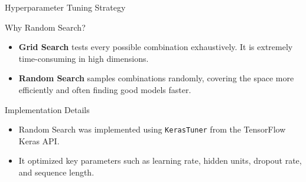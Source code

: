 \begin{frame}[label=hyperparamtuning, shrink]{Hyperparameter Tuning Strategy}
\begin{block}{Why Random Search?}
\begin{itemize}
    \item \textbf{Grid Search} tests every possible combination exhaustively. 
    It is \alert{extremely time-consuming in high dimensions}.
    \item \textbf{Random Search} samples combinations randomly, \alert{covering the
    space more efficiently and often finding good models faster}.
\end{itemize}
\end{block}

\begin{exampleblock}{Implementation Details}
\begin{itemize}
    \item Random Search was implemented using \texttt{KerasTuner} from the TensorFlow Keras API.
    \item It optimized key parameters such as learning rate, hidden units, dropout rate, and sequence length.
\end{itemize}
\end{exampleblock}

\end{frame}

